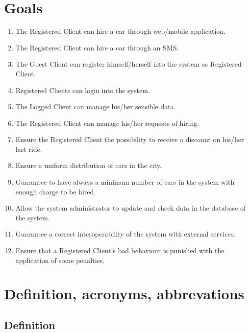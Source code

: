 \section{Goals}
\begin{enumerate}[label=\textbf{G\arabic*)}]
\item The Registered Client can hire a car through web/mobile application.
\item The Registered Client can hire a car through an SMS.
\item The Guest Client can register himself/herself into the system as Registered Client.
\item Registered Clients can login into the system.
\item The Logged Client can manage his/her sensible data.
\item The Registered Client can manage his/her requests of hiring.
\item Ensure the Registered Client the possibility to receive a discount on his/her last ride.
\item Ensure a uniform distribution of cars in the city.
\item Guarantee to have always a minimum number of cars in the system with enough charge to be hired.
\item Allow the system administrator to update and check data in the database of the system.
\item Guarantee a correct interoperability of the system with external services.
\item Ensure that a Registered Client’s bad behaviour is punished with the application of some penalties.
\end{enumerate}

\section{Definition, acronyms, abbrevations}

\subsection{Definition}

